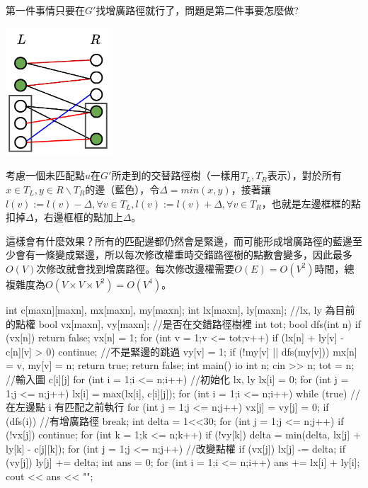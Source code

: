 \documentclass[main.tex]{subfiles}
\begin{document}
第一件事情只要在$G'$找增廣路徑就行了，問題是第二件事要怎麼做?
\begin{center}
\includegraphics[width=4cm]{images/Matching/KM.png}
\end{center}
考慮一個未匹配點$u$在$G'$所走到的交替路徑樹（一樣用$T_L, T_R$表示），對於所有$x \in T_L, y \in R \backslash T_R$的邊（藍色），令$\Delta = min(x, y)$，接著讓$l(v) := l(v) - \Delta, \forall v \in T_L, l(v) := l(v) + \Delta, \forall v \in T_R$，也就是左邊框框的點扣掉$\Delta$，右邊框框的點加上$\Delta$。
\par 這樣會有什麼效果？所有的匹配邊都仍然會是緊邊，而可能形成增廣路徑的藍邊至少會有一條變成緊邊，所以每次修改權重時交錯路徑樹的點數會變多，因此最多$O(V)$次修改就會找到增廣路徑。每次修改邊權需要$O(E) = O(V^2)$時間，總複雜度為$O(V \times V \times V^2) = O(V^4)$。
\begin{C++}
int c[maxn][maxn], mx[maxn], my[maxn];
int lx[maxn], ly[maxn]; //lx, ly 為目前的點權
bool vx[maxn], vy[maxn]; //是否在交錯路徑樹裡 
int tot;
bool dfs(int n) {
    if (vx[n]) return false;
    vx[n] = 1;
    for (int v = 1;v <= tot;v++) {
        if (lx[n] + ly[v] - c[n][v] > 0) continue; //不是緊邊的跳過
        vy[v] = 1;
        if (!my[v] || dfs(my[v])) {
            mx[n] = v, my[v] = n;
            return true;
        }
    }
    return false;
}
int main() {
    io
    int n;
    cin >> n;
    tot = n;
    //輸入圖 c[i][j]
    for (int i = 1;i <= n;i++) { //初始化 lx, ly
        lx[i] = 0;
        for (int j = 1;j <= n;j++) lx[i] = max(lx[i], c[i][j]);
    }
    for (int i = 1;i <= n;i++) {
        while (true) { //在左邊點 i 有匹配之前執行
            for (int j = 1;j <= n;j++) vx[j] = vy[j] = 0;
            if (dfs(i)) { //有增廣路徑
                break;
            }
            int delta = 1<<30;
            for (int j = 1;j <= n;j++) {
                if (!vx[j]) continue;
                for (int k = 1;k <= n;k++) {
                    if (!vy[k]) {
                        delta = min(delta, lx[j] + ly[k] - c[j][k]);     
                    }
                }
            }
            for (int j = 1;j <= n;j++) { //改變點權
                if (vx[j]) lx[j] -= delta;
                if (vy[j]) ly[j] += delta;
            }
        }
    }
    int ans = 0;
    for (int i = 1;i <= n;i++) ans += lx[i] + ly[i];
    cout << ans << "\n";
}  
\end{C++}
\end{document}
